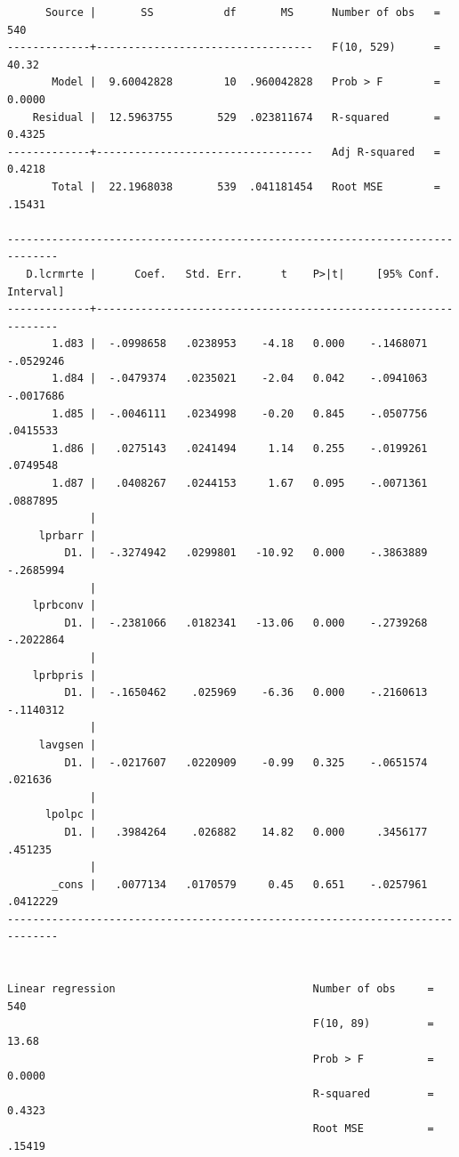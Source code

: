 \documentclass[
]{book}
\begin{document}
\begin{verbatim}
      Source |       SS           df       MS      Number of obs   =       540
-------------+----------------------------------   F(10, 529)      =     40.32
       Model |  9.60042828        10  .960042828   Prob > F        =    0.0000
    Residual |  12.5963755       529  .023811674   R-squared       =    0.4325
-------------+----------------------------------   Adj R-squared   =    0.4218
       Total |  22.1968038       539  .041181454   Root MSE        =    .15431

------------------------------------------------------------------------------
   D.lcrmrte |      Coef.   Std. Err.      t    P>|t|     [95% Conf. Interval]
-------------+----------------------------------------------------------------
       1.d83 |  -.0998658   .0238953    -4.18   0.000    -.1468071   -.0529246
       1.d84 |  -.0479374   .0235021    -2.04   0.042    -.0941063   -.0017686
       1.d85 |  -.0046111   .0234998    -0.20   0.845    -.0507756    .0415533
       1.d86 |   .0275143   .0241494     1.14   0.255    -.0199261    .0749548
       1.d87 |   .0408267   .0244153     1.67   0.095    -.0071361    .0887895
             |
     lprbarr |
         D1. |  -.3274942   .0299801   -10.92   0.000    -.3863889   -.2685994
             |
    lprbconv |
         D1. |  -.2381066   .0182341   -13.06   0.000    -.2739268   -.2022864
             |
    lprbpris |
         D1. |  -.1650462    .025969    -6.36   0.000    -.2160613   -.1140312
             |
     lavgsen |
         D1. |  -.0217607   .0220909    -0.99   0.325    -.0651574     .021636
             |
      lpolpc |
         D1. |   .3984264    .026882    14.82   0.000     .3456177     .451235
             |
       _cons |   .0077134   .0170579     0.45   0.651    -.0257961    .0412229
------------------------------------------------------------------------------


Linear regression                               Number of obs     =        540
                                                F(10, 89)         =      13.68
                                                Prob > F          =     0.0000
                                                R-squared         =     0.4323
                                                Root MSE          =     .15419


\end{verbatim}
\end{document}
